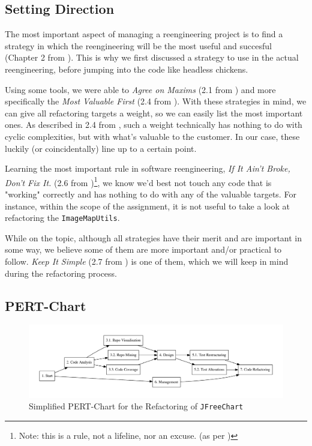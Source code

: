 \documentclass[11pt]{article}
\begin{document}
	\subsection{Setting Direction}
	The most important aspect of managing a reengineering project is to find a strategy in which the reengineering will be the most useful and succesful (Chapter 2 from \cite{demeyer2009object}). This is why we first discussed a strategy to use in the actual reengineering, before jumping into the code like headless chickens.
	
	Using some tools, we were able to \textsl{Agree on Maxims} (2.1 from \cite{demeyer2009object}) and more specifically the \textsl{Most Valuable First} (2.4 from \cite{demeyer2009object}). With these strategies in mind, we can give all refactoring targets a weight, so we can easily list the most important ones. As described in 2.4 from \cite{demeyer2009object}, such a weight technically has nothing to do with cyclic complexities, but with what's valuable to the customer. In our case, these luckily (or coincidentally) line up to a certain point.
	
	Learning the most important rule in software reengineering,
	\textsl{If It Ain't Broke, Don't Fix It.} (2.6 from \cite{demeyer2009object})\footnote{Note: this is a rule, not a lifeline, nor an excuse. (as per \cite{demeyer2009object})}, we know we'd best not touch any code that is "working" correctly and has nothing to do with any of the valuable targets. For instance, within the scope of the assignment, it is not useful to take a look at refactoring the \texttt{ImageMapUtils}.
	
	While on the topic, although all strategies have their merit and are important in some way, we believe some of them are more important and/or practical to follow. \textsl{Keep It Simple} (2.7 from \cite{demeyer2009object}) is one of them, which we will keep in mind during the refactoring process.
	
	\subsection{PERT-Chart} 
	\begin{figure}[H] 
		\centering 
		\includegraphics[width=\textwidth]{pert.pdf}
		\caption{Simplified PERT-Chart for the Refactoring of \texttt{JFreeChart}} 
		\label{pert} 
	\end{figure} 
   
\end{document}
